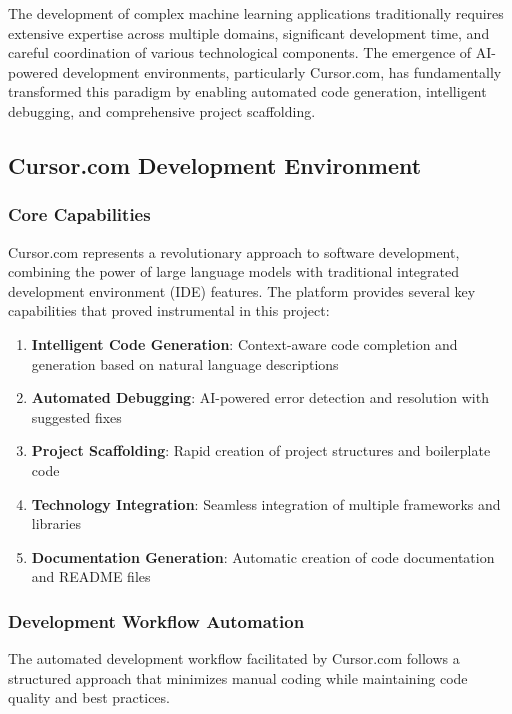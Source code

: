 \documentclass[12pt,letterpaper]{article}
\begin{document}
The development of complex machine learning applications traditionally requires extensive expertise across multiple domains, significant development time, and careful coordination of various technological components. The emergence of AI-powered development environments, particularly Cursor.com, has fundamentally transformed this paradigm by enabling automated code generation, intelligent debugging, and comprehensive project scaffolding.

\subsection{Cursor.com Development Environment}

\subsubsection{Core Capabilities}

Cursor.com represents a revolutionary approach to software development, combining the power of large language models with traditional integrated development environment (IDE) features. The platform provides several key capabilities that proved instrumental in this project:

\begin{enumerate}
    \item \textbf{Intelligent Code Generation}: Context-aware code completion and generation based on natural language descriptions
    \item \textbf{Automated Debugging}: AI-powered error detection and resolution with suggested fixes
    \item \textbf{Project Scaffolding}: Rapid creation of project structures and boilerplate code
    \item \textbf{Technology Integration}: Seamless integration of multiple frameworks and libraries
    \item \textbf{Documentation Generation}: Automatic creation of code documentation and README files
\end{enumerate}

\subsubsection{Development Workflow Automation}

The automated development workflow facilitated by Cursor.com follows a structured approach that minimizes manual coding while maintaining code quality and best practices.
\end{document}
